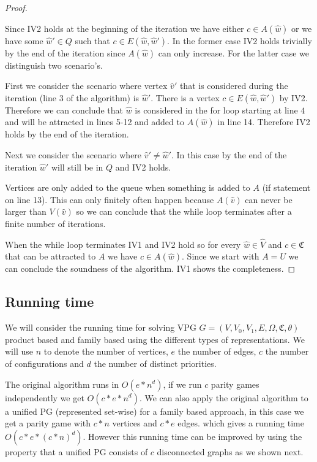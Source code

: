 \begin{theorem}
\begin{proof}
\begin{itemize}
			Since IV2 holds at the beginning of the iteration we have either $c \in A(\hat{w})$ or we have some $\hat{w}' \in Q$ such that $c \in E(\hat{w},\hat{w}')$. In the former case IV2 holds trivially by the end of the iteration since $A(\hat{w})$ can only increase. For the latter case we distinguish two scenario's. 
			
			First we consider the scenario where vertex $\hat{v}'$ that is considered during the iteration (line 3 of the algorithm) is $\hat{w}'$. There is a vertex $c \in E(\hat{w},\hat{w}')$ by IV2. Therefore we can conclude that $\hat{w}$ is considered in the for loop starting at line $4$ and will be attracted in lines 5-12 and added to $A(\hat{w})$ in line 14. Therefore IV2 holds by the end of the iteration.
			
			Next we consider the scenario where $\hat{v}' \neq \hat{w}'$. In this case by the end of the iteration $\hat{w}'$ will still be in $Q$ and IV2 holds.
		\end{itemize}
	
	Vertices are only added to the queue when something is added to $A$ (if statement on line 13). This can only finitely often happen because $A(\hat{v})$ can never be larger than $V(\hat{v})$ so we can conclude that the while loop terminates after a finite number of iterations.
	
		When the while loop terminates IV1 and IV2 hold so for every $\hat{w} \in \hat{V}$ and $c \in \mathfrak{C}$ that can be attracted to $A$ we have $c \in A(\hat{w})$. Since we start with $A = U$ we can conclude the soundness of the algorithm. IV1 shows the completeness.
	\end{proof}
\end{theorem}


\subsection{Running time}
We will consider the running time for solving VPG $G = (V,V_0,V_1,E,\Omega,\mathfrak{C},\theta)$ product based and family based using the different types of representations. We will use $n$ to denote the number of vertices, $e$ the number of edges, $c$ the number of configurations and $d$ the number of distinct priorities.

The original algorithm runs in $O(e * n^d)$, if we run $c$ parity games independently we get $O(c * e * n ^d)$. We can also apply the original algorithm to a unified PG (represented set-wise) for a family based approach, in this case we get a parity game with $c*n$ vertices and $c*e$ edges. which gives a running time $O(c*e*(c*n)^d)$. However this running time can be improved by using the property that a unified PG consists of $c$ disconnected graphs as we shown next.

